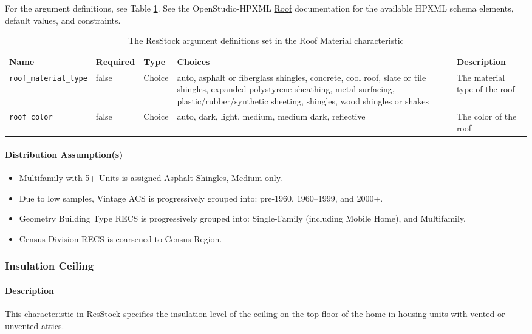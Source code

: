 For the argument definitions, see Table \ref{table:hc_arg_def_roof_mat}. See the OpenStudio-HPXML \href{https://openstudio-hpxml.readthedocs.io/en/v1.8.1/workflow_inputs.html#hpxml-roof}{Roof} documentation for the available HPXML schema elements, default values, and constraints.

\begin{longtable}[]{|p{3.5cm}|p{1.1cm}|p{1.1cm}|p{3.5cm}|p{3.3cm}|} \caption{The ResStock argument definitions set in the Roof Material characteristic} \label{table:hc_arg_def_roof_mat} \\

\toprule\noalign{}
Name & Required &  Type & Choices & Description \\
\midrule\noalign{}
\endhead
\bottomrule\noalign{}
\endlastfoot
\texttt{roof\_material\_type} & false & Choice & auto, asphalt or
fiberglass shingles, concrete, cool roof, slate or tile shingles,
expanded polystyrene sheathing, metal surfacing,
plastic/rubber/synthetic sheeting, shingles, wood shingles or shakes &
The material type of the roof \\
\hline
\texttt{roof\_color} & false  & Choice & auto, dark, light, medium,
medium dark, reflective & The color of the roof \\
\end{longtable}
\paragraph{Distribution Assumption(s)}

\begin{itemize}
 
\item
  Multifamily with 5+ Units is assigned \textquotesingle Asphalt
  Shingles, Medium\textquotesingle{} only.
\item
  Due to low samples, Vintage ACS is progressively grouped into:
  pre-1960, 1960--1999, and 2000+.
\item
  Geometry Building Type RECS is progressively grouped into:
  Single-Family (including Mobile Home), and Multifamily.
\item
  Census Division RECS is coarsened to Census Region.
\end{itemize}

\subsubsection{Insulation Ceiling}\label{insulation_ceiling}
\paragraph{Description}
This characteristic in ResStock specifies the insulation level of the ceiling on the top floor of the home in housing units with vented or unvented attics. 

